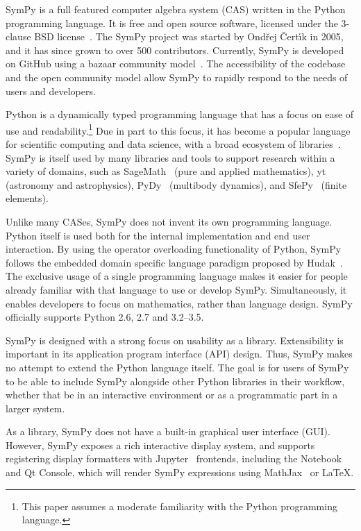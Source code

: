 SymPy is a full featured computer algebra system (CAS) written in the
Python~\cite{lutz2013learning}
programming language.
It is free and open source software, licensed under the 3-clause BSD
license~\cite{rosen2005open}.
The SymPy project was started by Ond\v{r}ej \v{C}ert\'{\i}k in 2005, and it has
since grown to over 500 contributors. Currently, SymPy is
developed on GitHub using a bazaar community
model~\cite{raymond1999cathedral}. The accessibility of the codebase and the
open community model allow SymPy to rapidly respond to the needs of
users and developers.

Python is a dynamically typed programming language that has a focus on
ease of use and readability.\footnote{This paper assumes a moderate
  familiarity with the Python programming language.} Due in part to this focus, it has become a popular
language for scientific
computing and data science, with a broad ecosystem of
libraries~\cite{oliphant2007python}. SymPy is itself used by many libraries
and tools to support research within a variety of domains, such as
SageMath~\cite{sagemath} (pure and applied mathematics),
yt~\cite{2011ApJS..192....9T} (astronomy and astrophysics),
PyDy~\cite{gede2013constrained} (multibody dynamics), and
SfePy~\cite{cimrman2014sfepy} (finite elements).

Unlike many CASes, SymPy does not invent its own programming language. Python
itself is used both for the internal implementation and end user
interaction. By using the operator overloading functionality of Python, SymPy follows the embedded domain specific language paradigm proposed by Hudak~\cite{dsl-little-languages}.  The exclusive usage of a single programming language makes it easier
for people already familiar with that language to use or develop SymPy.
Simultaneously, it enables developers to focus on mathematics, rather than
language design.  SymPy officially supports Python 2.6, 2.7 and 3.2--3.5.

SymPy is designed with a strong focus on usability as a library.
Extensibility is important in its application program interface
(API) design. Thus, SymPy makes no attempt to extend
the Python language itself. The goal is for users of SymPy to be able to
include SymPy alongside other Python libraries in their workflow, whether that
be in an interactive environment or as a programmatic part in a larger system.

As a library, SymPy does not have a built-in graphical user interface (GUI).
However, SymPy exposes a rich interactive display system, and supports
registering display formatters with Jupyter~\cite{kluyver2016jupyter} frontends,
including the Notebook and Qt Console, which will render SymPy expressions
using MathJax~\cite{cervone2012mathjax} or \LaTeX{}.

